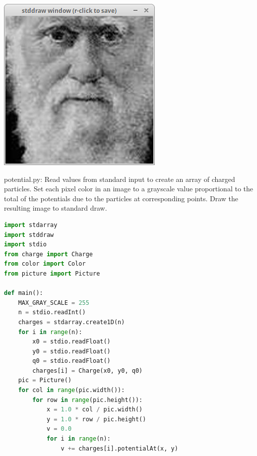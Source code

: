 \documentclass[8pt,a4paper,compress,handout]{beamer}
\begin{document}
\begin{frame}[fragile]
\begin{minipage}{300pt}
\includegraphics[scale=0.15]{figures/fade6.png}
\end{minipage}%
\end{frame}

\begin{frame}[fragile]
\begin{framed}
\tiny potential.py: Read values from standard input to create an array of charged particles. Set each pixel color in an image to a grayscale value proportional to the total of the potentials due to the particles at corresponding points. Draw the resulting image to standard draw.
\end{framed}

\begin{lstlisting}[language=Python]
import stdarray
import stddraw
import stdio
from charge import Charge
from color import Color
from picture import Picture

def main():
    MAX_GRAY_SCALE = 255
    n = stdio.readInt()
    charges = stdarray.create1D(n)
    for i in range(n):
        x0 = stdio.readFloat()
        y0 = stdio.readFloat()
        q0 = stdio.readFloat()
        charges[i] = Charge(x0, y0, q0)
    pic = Picture()
    for col in range(pic.width()):
        for row in range(pic.height()):
            x = 1.0 * col / pic.width()
            y = 1.0 * row / pic.height()
            v = 0.0
            for i in range(n):
                v += charges[i].potentialAt(x, y)    
\end{lstlisting}
\end{frame}
\end{document}
